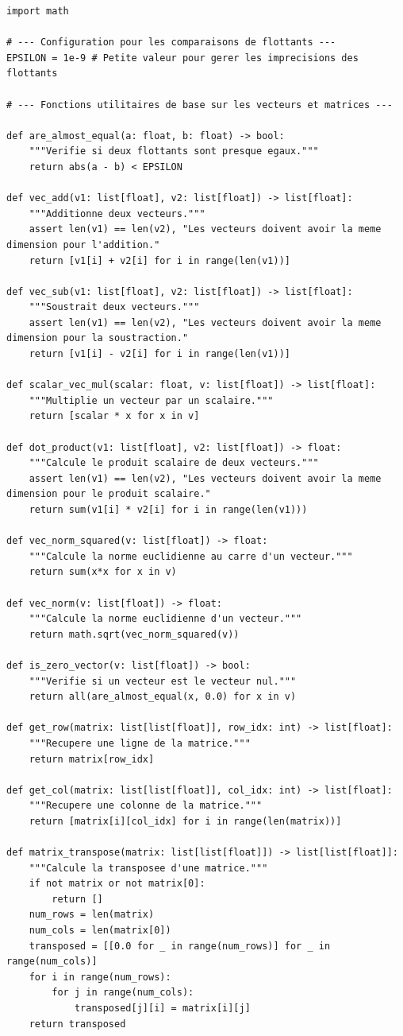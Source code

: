 \documentclass{report}
\begin{document}
\begin{verbatim}
import math

# --- Configuration pour les comparaisons de flottants ---
EPSILON = 1e-9 # Petite valeur pour gerer les imprecisions des flottants

# --- Fonctions utilitaires de base sur les vecteurs et matrices ---

def are_almost_equal(a: float, b: float) -> bool:
    """Verifie si deux flottants sont presque egaux."""
    return abs(a - b) < EPSILON

def vec_add(v1: list[float], v2: list[float]) -> list[float]:
    """Additionne deux vecteurs."""
    assert len(v1) == len(v2), "Les vecteurs doivent avoir la meme dimension pour l'addition."
    return [v1[i] + v2[i] for i in range(len(v1))]

def vec_sub(v1: list[float], v2: list[float]) -> list[float]:
    """Soustrait deux vecteurs."""
    assert len(v1) == len(v2), "Les vecteurs doivent avoir la meme dimension pour la soustraction."
    return [v1[i] - v2[i] for i in range(len(v1))]

def scalar_vec_mul(scalar: float, v: list[float]) -> list[float]:
    """Multiplie un vecteur par un scalaire."""
    return [scalar * x for x in v]

def dot_product(v1: list[float], v2: list[float]) -> float:
    """Calcule le produit scalaire de deux vecteurs."""
    assert len(v1) == len(v2), "Les vecteurs doivent avoir la meme dimension pour le produit scalaire."
    return sum(v1[i] * v2[i] for i in range(len(v1)))

def vec_norm_squared(v: list[float]) -> float:
    """Calcule la norme euclidienne au carre d'un vecteur."""
    return sum(x*x for x in v)

def vec_norm(v: list[float]) -> float:
    """Calcule la norme euclidienne d'un vecteur."""
    return math.sqrt(vec_norm_squared(v))

def is_zero_vector(v: list[float]) -> bool:
    """Verifie si un vecteur est le vecteur nul."""
    return all(are_almost_equal(x, 0.0) for x in v)

def get_row(matrix: list[list[float]], row_idx: int) -> list[float]:
    """Recupere une ligne de la matrice."""
    return matrix[row_idx]

def get_col(matrix: list[list[float]], col_idx: int) -> list[float]:
    """Recupere une colonne de la matrice."""
    return [matrix[i][col_idx] for i in range(len(matrix))]

def matrix_transpose(matrix: list[list[float]]) -> list[list[float]]:
    """Calcule la transposee d'une matrice."""
    if not matrix or not matrix[0]:
        return []
    num_rows = len(matrix)
    num_cols = len(matrix[0])
    transposed = [[0.0 for _ in range(num_rows)] for _ in range(num_cols)]
    for i in range(num_rows):
        for j in range(num_cols):
            transposed[j][i] = matrix[i][j]
    return transposed


\end{verbatim}
\end{document}
